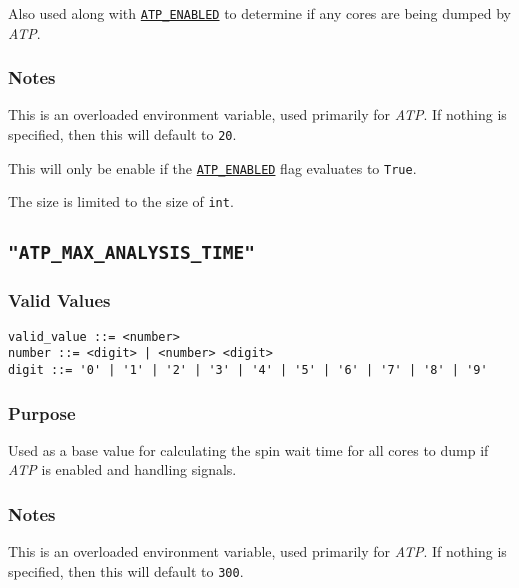 Also used along with \hyperref[section:flags:ATP_ENABLED]{\texttt{ATP\_ENABLED}} to determine if any cores are being dumped by \textit{ATP}.

\vspace{-2ex}
\subsubsection{Notes}
\vspace{-2ex}
This is an overloaded environment variable, used primarily for \textit{ATP}. If nothing is specified, then this will default to \texttt{20}.

This will only be enable if the \hyperref[section:flags:ATP_ENABLED]{\texttt{ATP\_ENABLED}} flag evaluates to \verb|True|.

The size is limited to the size of \verb|int|.



\subsection{\texttt{"ATP\_MAX\_ANALYSIS\_TIME"}}
\label{section:flags:ATP_MAX_ANALYSIS_TIME}
\vspace{-2ex}
\subsubsection{Valid Values}
\vspace{-2ex}
\verb+valid_value ::= <number>+ \\
\verb+number ::= <digit> | <number> <digit>+ \\
\verb+digit ::= '0' | '1' | '2' | '3' | '4' | '5' | '6' | '7' | '8' | '9'+

\vspace{-2ex}
\subsubsection{Purpose}
\vspace{-2ex}
Used as a base value for calculating the spin wait time for all cores to dump if \textit{ATP} is enabled and handling signals.

\vspace{-2ex}
\subsubsection{Notes}
\vspace{-2ex}
This is an overloaded environment variable, used primarily for \textit{ATP}. If nothing is specified, then this will default to \texttt{300}.

